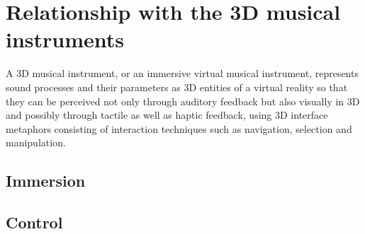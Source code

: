\section{Relationship with the 3D musical instruments}

A 3D musical instrument, or an immersive virtual musical instrument, represents sound processes and their parameters as 3D entities of a virtual reality so that they can be perceived not only through auditory feedback but also visually in 3D and possibly through tactile as well as haptic feedback, using 3D interface metaphors consisting of interaction techniques such as navigation, selection and manipulation.

\subsection{Immersion}


\subsection{Control}